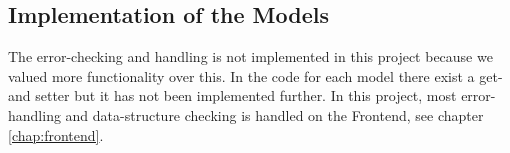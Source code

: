 \subsection{Implementation of the Models}\label{subsec:implementationmodels}
The error-checking and handling is not implemented in this project because we valued more functionality over this. In the code for each model there exist a get- and setter but it has not been implemented further. In this project, most error-handling and data-structure checking is handled on the Frontend, see chapter \ref{chap:frontend}.